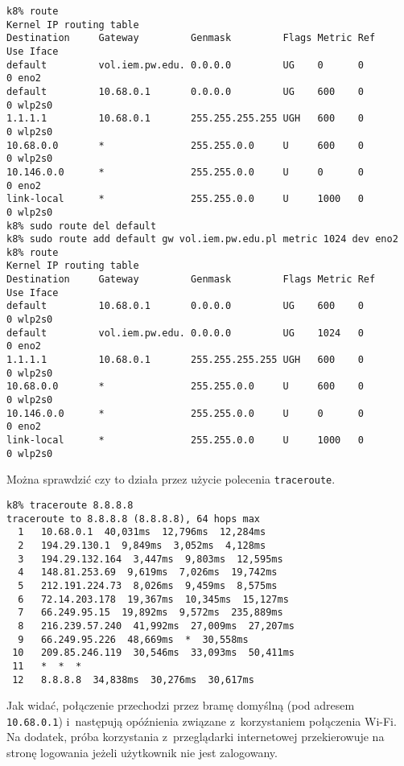 \documentclass[a4paper,11pt]{article}
\begin{document}
\begin{verbatim}
k8% route
Kernel IP routing table
Destination     Gateway         Genmask         Flags Metric Ref    Use Iface
default         vol.iem.pw.edu. 0.0.0.0         UG    0      0        0 eno2
default         10.68.0.1       0.0.0.0         UG    600    0        0 wlp2s0
1.1.1.1         10.68.0.1       255.255.255.255 UGH   600    0        0 wlp2s0
10.68.0.0       *               255.255.0.0     U     600    0        0 wlp2s0
10.146.0.0      *               255.255.0.0     U     0      0        0 eno2
link-local      *               255.255.0.0     U     1000   0        0 wlp2s0
k8% sudo route del default
k8% sudo route add default gw vol.iem.pw.edu.pl metric 1024 dev eno2
k8% route
Kernel IP routing table
Destination     Gateway         Genmask         Flags Metric Ref    Use Iface
default         10.68.0.1       0.0.0.0         UG    600    0        0 wlp2s0
default         vol.iem.pw.edu. 0.0.0.0         UG    1024   0        0 eno2
1.1.1.1         10.68.0.1       255.255.255.255 UGH   600    0        0 wlp2s0
10.68.0.0       *               255.255.0.0     U     600    0        0 wlp2s0
10.146.0.0      *               255.255.0.0     U     0      0        0 eno2
link-local      *               255.255.0.0     U     1000   0        0 wlp2s0
\end{verbatim}

Można sprawdzić czy to działa przez użycie polecenia \verb|traceroute|.

\begin{verbatim}
k8% traceroute 8.8.8.8
traceroute to 8.8.8.8 (8.8.8.8), 64 hops max
  1   10.68.0.1  40,031ms  12,796ms  12,284ms
  2   194.29.130.1  9,849ms  3,052ms  4,128ms
  3   194.29.132.164  3,447ms  9,803ms  12,595ms
  4   148.81.253.69  9,619ms  7,026ms  19,742ms
  5   212.191.224.73  8,026ms  9,459ms  8,575ms
  6   72.14.203.178  19,367ms  10,345ms  15,127ms
  7   66.249.95.15  19,892ms  9,572ms  235,889ms
  8   216.239.57.240  41,992ms  27,009ms  27,207ms
  9   66.249.95.226  48,669ms  *  30,558ms
 10   209.85.246.119  30,546ms  33,093ms  50,411ms
 11   *  *  *
 12   8.8.8.8  34,838ms  30,276ms  30,617ms
\end{verbatim}

Jak widać, połączenie przechodzi przez bramę domyślną (pod adresem \verb|10.68.0.1|)
i~następują opóźnienia związane z~korzystaniem połączenia Wi-Fi. Na dodatek,
próba korzystania z~przeglądarki internetowej przekierowuje na stronę logowania
jeżeli użytkownik nie jest zalogowany.
\end{document}
